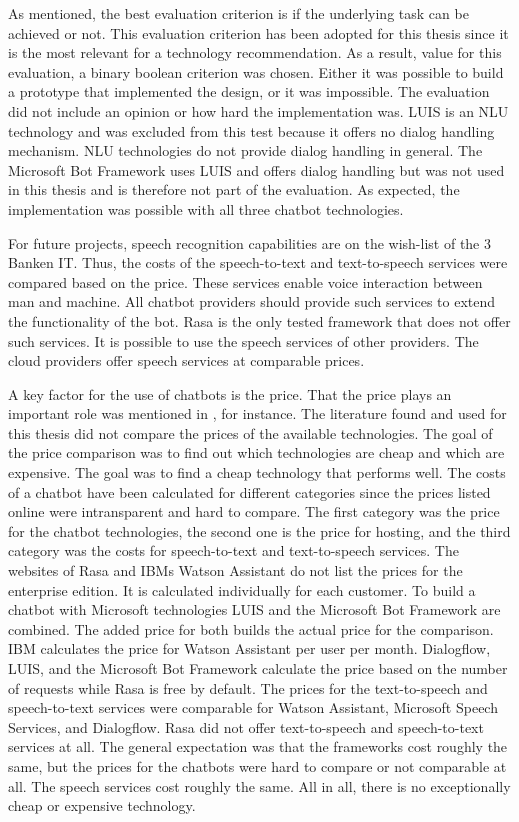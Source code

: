 As \citet{singhbuilding} mentioned, the best evaluation criterion is if the underlying task can be achieved or not.
This evaluation criterion has been adopted for this thesis since it is the 
most relevant for a technology recommendation.
As a result, value for this evaluation, a binary boolean criterion was chosen.
Either it was possible to build a prototype that implemented the design, or it was impossible.
The evaluation did not include an opinion or how hard the implementation was.
LUIS is an NLU technology and was excluded from this test because it offers no dialog handling mechanism.
NLU technologies do not provide dialog handling in general. 
The Microsoft Bot Framework uses LUIS and offers dialog handling but was not used in this thesis and is therefore not part of the evaluation.
As expected, the implementation was possible with all three chatbot technologies.

For future projects, speech recognition capabilities are on the wish-list of the 3 Banken IT.
Thus, the costs of the speech-to-text and text-to-speech services were compared based on the price.
These services enable voice interaction between man and machine.
All chatbot providers should provide such services to extend the functionality of the bot.
Rasa is the only tested framework that does not offer such services.
It is possible to use the speech services of other providers.
The cloud providers offer speech services at comparable prices.

A key factor for the use of chatbots is the price.
That the price plays an important role was mentioned in \citet{buiildChatbotsPython}, for instance.
The literature found and used for this thesis did not compare the prices of the available technologies.
The goal of the price comparison was to find out which technologies are cheap and which are expensive.
The goal was to find a cheap technology that performs well.
The costs of a chatbot have been calculated for different categories since the prices listed online were intransparent and hard to compare.
The first category was the price for the chatbot technologies, the second 
one is the price for hosting, and the third category was the costs
for speech-to-text and text-to-speech services.
The websites of Rasa and IBMs Watson Assistant do not list the prices for the enterprise edition. 
It is calculated individually for each customer.
To build a chatbot with Microsoft technologies LUIS and the Microsoft Bot Framework are combined.
The added price for both builds the actual price for the comparison.
IBM calculates the price for Watson Assistant per user per month.
Dialogflow, LUIS, and the Microsoft Bot Framework calculate the price based on the number of requests while Rasa is free by default.
The prices for the text-to-speech and speech-to-text services were comparable for Watson Assistant, Microsoft Speech Services, and Dialogflow.
Rasa did not offer text-to-speech and speech-to-text services at all.
The general expectation was that the frameworks cost roughly the same, but the prices for the chatbots were hard to compare or not comparable at all.
The speech services cost roughly the same.
All in all, there is no exceptionally cheap or expensive technology.


